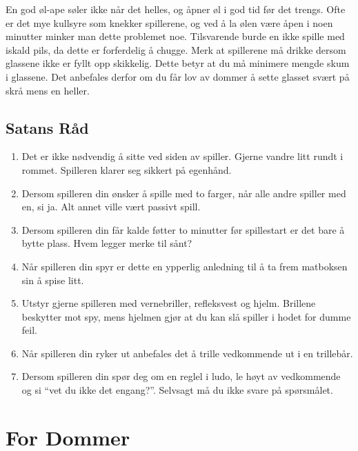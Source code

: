 \documentclass[10pt,a4paper,norsk,openany]{book}
\begin{document}
En god øl-ape søler ikke når det helles, og åpner øl i god tid før det trengs.
Ofte er det mye kullsyre som knekker spillerene, og ved å la ølen være åpen i
noen minutter minker man dette problemet noe. Tilsvarende burde en ikke spille
med iskald pils, da dette er forferdelig å chugge. Merk at spillerene må drikke
dersom glassene ikke er fyllt opp skikkelig. Dette betyr at du må minimere
mengde skum i glassene. Det anbefales derfor om du får lov av dommer å sette
glasset svært på skrå mens en heller. 


\section{Satans Råd}

\begin{enumerate}
  \item Det er ikke nødvendig å sitte ved siden av spiller. Gjerne vandre litt
    rundt i rommet. Spilleren klarer seg sikkert på egenhånd.
    
  \item Dersom spilleren din ønsker å spille med to farger, når alle andre
    spiller med en, si ja. Alt annet ville vært passivt spill.

  \item Dersom spilleren din får kalde føtter to minutter før spillestart er det
    bare å bytte plass. Hvem legger merke til sånt?

  \item Når spilleren din spyr er dette en ypperlig anledning til å ta frem
    matboksen sin å spise litt.

  \item Utstyr gjerne spilleren med vernebriller, refleksvest og hjelm. Brillene
    beskytter mot spy, mens hjelmen gjør at du kan slå spiller i hodet for dumme
    feil.

  \item Når spilleren din ryker ut anbefales det å trille vedkommende ut i en
    trillebår.

  \item Dersom spilleren din spør deg om en reglel i ludo, le høyt av vedkommende
    og si ``vet du ikke det engang?''. Selvsagt må du ikke svare på spørsmålet.
\end{enumerate}


\chapter{For Dommer}
\end{document}
